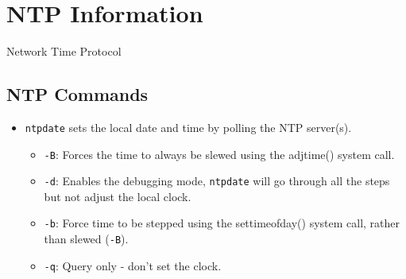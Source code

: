 \section{NTP Information}
Network Time Protocol
\subsection{NTP Commands}
\begin{itemize}
    \item \verb|ntpdate| sets the local date and time by polling the NTP server(s).
    \begin{itemize}
        \item \verb|-B|: Forces the time to always be slewed using the adjtime() system call.
        \item \verb|-d|: Enables the debugging mode, \verb|ntpdate| will go through all the steps but not adjust the local clock.
        \item \verb|-b|: Force time to be stepped using the settimeofday() system call, rather than slewed (\verb|-B|).
        \item \verb|-q|: Query only - don't set the clock.
    \end{itemize}
\end{itemize}